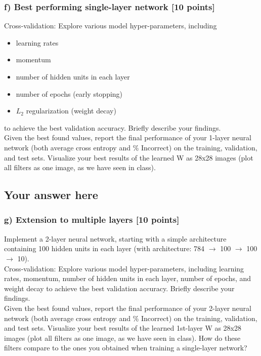 \documentclass{article}
\begin{document}
\subsubsection*{f) Best performing single-layer network [10 points]}
Cross-validation: 
Explore various model hyper-parameters, including 
\begin{itemize}
\item learning rates
\vspace{-0.09in}
\item momentum
\vspace{-0.09in}
\item number of hidden units in each layer
\vspace{-0.09in}
\item number of epochs (early stopping)
\vspace{-0.09in}
\item $L_2$ regularization (weight decay)
\end{itemize}
to achieve the best validation accuracy. Briefly describe your findings.
\\

Given the best found values, report the final performance of your 1-layer neural
network (both average cross entropy and \% Incorrect) on the training, validation, and test sets.
Visualize your best results of the learned W as 28x28 images 
(plot all filters as one image, as we have seen in class).

\subsection*{Your answer here}

\subsubsection*{g) Extension to multiple layers [10 points]}
Implement a 2-layer neural network, starting with a simple architecture 
containing 100 hidden units in each layer
(with architecture: 784 $\rightarrow$ 100 $\rightarrow$ 100 $\rightarrow$  10).
\\
  
Cross-validation: Explore various model hyper-parameters, including learning rates, 
momentum, number of hidden units in each layer, number of epochs, and weight decay 
to achieve the best validation accuracy. Briefly describe your findings.  
\\

Given the best found values, report the final performance of your 2-layer neural
network (both average cross entropy and \% Incorrect) on the training, validation, and test sets.
Visualize your best results of the learned 1st-layer W as 28x28 images 
(plot all filters as one image, as we have seen in class).
How do these filters compare to the ones you obtained when training a
single-layer network?
\\
\end{document}
